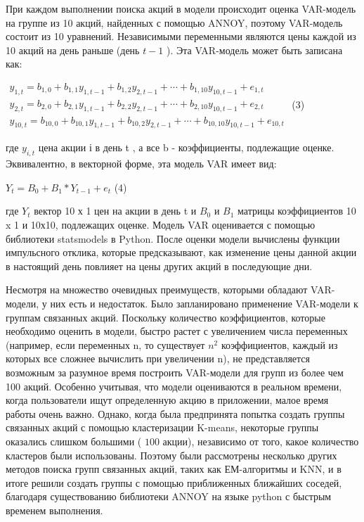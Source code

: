 {При каждом выполнении поиска акций в модели происходит оценка VAR-модель
на группе из 10 акций, найденных с помощью ANNOY, поэтому VAR-модель
состоит из 10 уравнений. Независимыми переменными являются цены каждой
из 10 акций на день раньше (день \(t - 1\) ). Эта VAR-модель может быть
записана как:

\(\begin{matrix}
y_{1,t} = b_{1,0} + b_{1,1}y_{1,t - 1} + b_{1,2}y_{2,t - 1} + \cdots + b_{1,10}y_{10,t - 1} + e_{1,t} \\
y_{2,t} = b_{2,0} + b_{2,1}y_{1,t - 1} + b_{2,2}y_{2,t - 1} + \cdots + b_{2,10}y_{10,t - 1} + e_{2,t} \\
y_{10,t} = b_{10,0} + b_{10,1}y_{1,t - 1} + b_{10,2}y_{2,t - 1} + \cdots + b_{10,10}y_{10,t - 1} + e_{10,t}
\end{matrix}\) (3)

где \(y_{i,t}\) цена акции і в день t , а все b - коэффициенты,
подлежащие оценке. Эквивалентно, в векторной форме, эта модель VAR имеет
вид:

\(Y_{t} = B_{0} + B_{1} \ast Y_{t - 1} + e_{t}\) (4)

где \(Y_{t}\) вектор 10 х 1 цен на акции в день t и \(B_{0}\) и
\(B_{1}\) матрицы коэффициентов 10 x 1 и 10х10, подлежащих оценке.
Модель VAR оценивается с помощью библиотеки statsmodels в Python. После
оценки модели вычислены функции импульсного отклика, которые
предсказывают, как изменение цены данной акции в настоящий день повлияет
на цены других акций в последующие дни.

Несмотря на множество очевидных преимуществ, которыми обладают
VAR-модели, у них есть и недостаток. Было запланировано применение
VAR-модели к группам связанных акций. Поскольку количество
коэффициентов, которые необходимо оценить в модели, быстро растет с
увеличением числа переменных (например, если переменных n, то существует
\(n^{2}\) коэффициентов, каждый из которых все сложнее вычислить при
увеличении n), не представляется возможным за разумное время построить
VAR-модели для групп из более чем 100 акций. Особенно учитывая, что
модели оцениваются в реальном времени, когда пользователи ищут
определенную акцию в приложении, малое время работы очень важно. Однако,
когда была предпринята попытка создать группы связанных акций с помощью
кластеризации K-means, некоторые группы оказались слишком большими (
\(100\) акции), независимо от того, какое количество кластеров были
использованы. Поэтому были рассмотрены несколько других методов поиска
групп связанных акций, таких как ЕМ-алгоритмы и KNN, и в итоге решили
создать группы с помощью приближенных ближайших соседей, благодаря
существованию библиотеки ANNOY на языке python с быстрым временем
выполнения.

}
